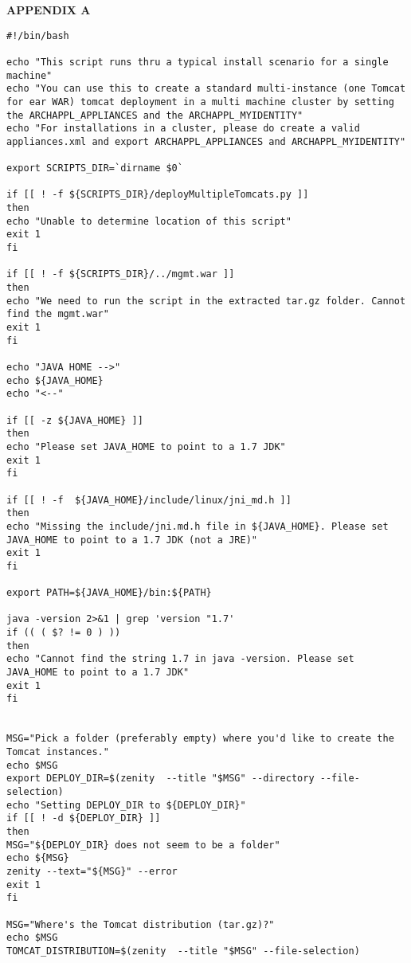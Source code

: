 \documentclass[11pt
  , a4paper
  , article
  , oneside
]{memoir}
\begin{document}
\clearpage




\clearpage

\begin{center}
\label{appx:a}\LARGE\textbf{APPENDIX A}
\end{center}

\begin{lstlisting}[style=termstyle]
#!/bin/bash

echo "This script runs thru a typical install scenario for a single machine"
echo "You can use this to create a standard multi-instance (one Tomcat for ear WAR) tomcat deployment in a multi machine cluster by setting the ARCHAPPL_APPLIANCES and the ARCHAPPL_MYIDENTITY"
echo "For installations in a cluster, please do create a valid appliances.xml and export ARCHAPPL_APPLIANCES and ARCHAPPL_MYIDENTITY"

export SCRIPTS_DIR=`dirname $0`

if [[ ! -f ${SCRIPTS_DIR}/deployMultipleTomcats.py ]]
then
echo "Unable to determine location of this script"
exit 1
fi

if [[ ! -f ${SCRIPTS_DIR}/../mgmt.war ]]
then
echo "We need to run the script in the extracted tar.gz folder. Cannot find the mgmt.war"
exit 1
fi

echo "JAVA HOME -->"
echo ${JAVA_HOME}
echo "<--"

if [[ -z ${JAVA_HOME} ]]
then
echo "Please set JAVA_HOME to point to a 1.7 JDK"
exit 1
fi

if [[ ! -f  ${JAVA_HOME}/include/linux/jni_md.h ]]
then
echo "Missing the include/jni.md.h file in ${JAVA_HOME}. Please set JAVA_HOME to point to a 1.7 JDK (not a JRE)"
exit 1
fi

export PATH=${JAVA_HOME}/bin:${PATH}

java -version 2>&1 | grep 'version "1.7'
if (( ( $? != 0 ) ))
then
echo "Cannot find the string 1.7 in java -version. Please set JAVA_HOME to point to a 1.7 JDK"
exit 1
fi


MSG="Pick a folder (preferably empty) where you'd like to create the Tomcat instances."
echo $MSG
export DEPLOY_DIR=$(zenity  --title "$MSG" --directory --file-selection)
echo "Setting DEPLOY_DIR to ${DEPLOY_DIR}"
if [[ ! -d ${DEPLOY_DIR} ]]
then
MSG="${DEPLOY_DIR} does not seem to be a folder"
echo ${MSG}
zenity --text="${MSG}" --error
exit 1
fi

MSG="Where's the Tomcat distribution (tar.gz)?"
echo $MSG
TOMCAT_DISTRIBUTION=$(zenity  --title "$MSG" --file-selection)


\end{lstlisting}
\end{document}
